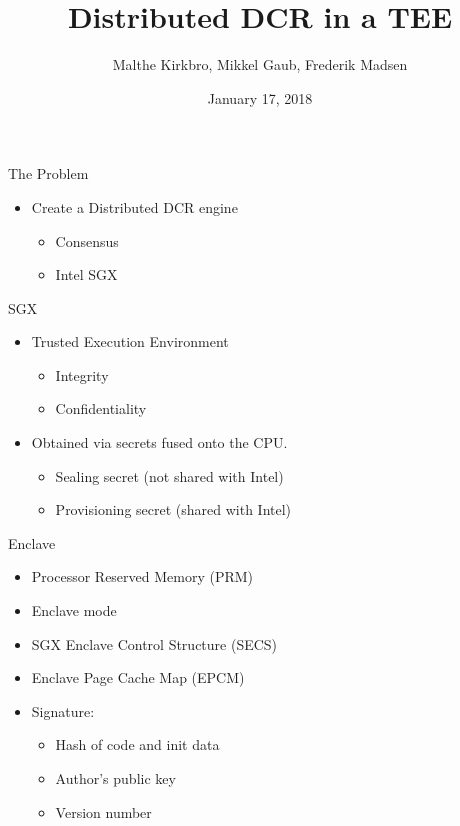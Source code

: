 \documentclass{beamer}
\title{Distributed DCR in a TEE}
\author{Malthe Kirkbro, Mikkel Gaub, Frederik Madsen}
\date{January 17, 2018}
\begin{document}


	\begin{frame}
		\maketitle
	\end{frame}

	\begin{frame}{The Problem} %
		\begin{itemize}
			\item Create a Distributed DCR engine
			\begin{itemize}
				\item Consensus
				\item Intel SGX
			\end{itemize}
		\end{itemize}
	\end{frame}

	\begin{frame}{SGX} %
		\begin{itemize}
			\item Trusted Execution Environment
			\begin{itemize}
				\item Integrity
				\item Confidentiality
			\end{itemize}
			\item Obtained via secrets fused onto the CPU.
			\begin{itemize}
				\item Sealing secret (not shared with Intel)
				\item Provisioning secret (shared with Intel)
			\end{itemize}
		\end{itemize}
	\end{frame}

	\begin{frame}{Enclave} %
		\begin{itemize}
			\item Processor Reserved Memory (PRM)
			\item Enclave mode
		\end{itemize}
		\begin{itemize}
			\item SGX Enclave Control Structure (SECS)
			\item Enclave Page Cache Map (EPCM)
		\end{itemize}
		\begin{itemize}
			\item Signature:	
			\begin{itemize}
				\item Hash of code and init data
				\item Author's public key
				\item Version number
			\end{itemize}
		\end{itemize}
	\end{frame}
\end{document}
